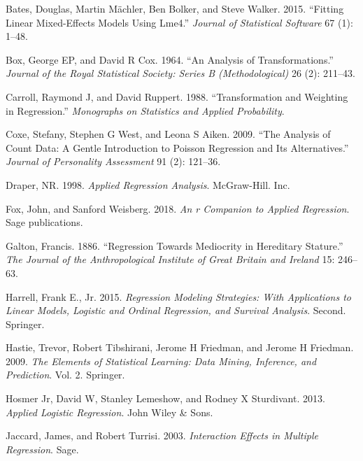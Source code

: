 \documentclass[
  letterpaper,
  DIV=11,
  numbers=noendperiod]{scrreprt}
\newlength{\cslhangindent}
\newenvironment{CSLReferences}[2] %
 {\begin{list}{}{%
  \setlength{\itemindent}{0pt}
  \setlength{\leftmargin}{0pt}
  \setlength{\parsep}{0pt}
  \ifodd #1
   \setlength{\leftmargin}{\cslhangindent}
   \setlength{\itemindent}{-1\cslhangindent}
  \fi
  \setlength{\itemsep}{#2\baselineskip}}}
 {\end{list}}
\begin{document}
\label{refs}
\begin{CSLReferences}{1}{0}
Bates, Douglas, Martin Mächler, Ben Bolker, and Steve Walker. 2015.
{``Fitting Linear Mixed-Effects Models Using Lme4.''} \emph{Journal of
Statistical Software} 67 (1): 1--48.

Box, George EP, and David R Cox. 1964. {``An Analysis of
Transformations.''} \emph{Journal of the Royal Statistical Society:
Series B (Methodological)} 26 (2): 211--43.

Carroll, Raymond J, and David Ruppert. 1988. {``Transformation and
Weighting in Regression.''} \emph{Monographs on Statistics and Applied
Probability}.

Coxe, Stefany, Stephen G West, and Leona S Aiken. 2009. {``The Analysis
of Count Data: A Gentle Introduction to Poisson Regression and Its
Alternatives.''} \emph{Journal of Personality Assessment} 91 (2):
121--36.

Draper, NR. 1998. \emph{Applied Regression Analysis}. McGraw-Hill. Inc.

Fox, John, and Sanford Weisberg. 2018. \emph{An r Companion to Applied
Regression}. Sage publications.

Galton, Francis. 1886. {``Regression Towards Mediocrity in Hereditary
Stature.''} \emph{The Journal of the Anthropological Institute of Great
Britain and Ireland} 15: 246--63.

Harrell, Frank E., Jr. 2015. \emph{Regression Modeling Strategies: With
Applications to Linear Models, Logistic and Ordinal Regression, and
Survival Analysis}. Second. Springer.

Hastie, Trevor, Robert Tibshirani, Jerome H Friedman, and Jerome H
Friedman. 2009. \emph{The Elements of Statistical Learning: Data Mining,
Inference, and Prediction}. Vol. 2. Springer.

Hosmer Jr, David W, Stanley Lemeshow, and Rodney X Sturdivant. 2013.
\emph{Applied Logistic Regression}. John Wiley \& Sons.

Jaccard, James, and Robert Turrisi. 2003. \emph{Interaction Effects in
Multiple Regression}. Sage.


\end{CSLReferences}
\end{document}

